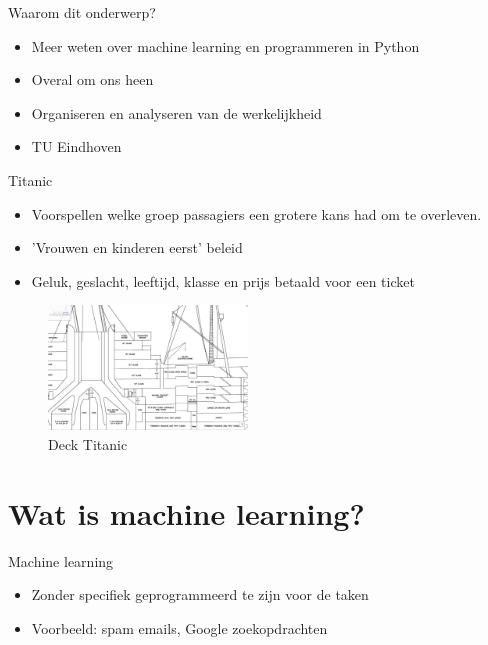 \documentclass[presentation]{beamer}
\begin{document}
\begin{frame}[label={sec:org4663e78}]{Waarom dit onderwerp?}
\begin{itemize}
\item Meer weten over machine learning en programmeren in Python
\item Overal om ons heen
\item Organiseren en analyseren van de werkelijkheid
\item TU Eindhoven
\end{itemize}
\end{frame}


\begin{frame}[label={sec:org2e7acb5}]{Titanic}
\begin{itemize}
\item Voorspellen welke groep passagiers een grotere kans had om te overleven.
\item 'Vrouwen en kinderen eerst' beleid
\item Geluk, geslacht, leeftijd, klasse en prijs betaald voor een ticket
\end{itemize}
\begin{figure}[htbp]
\centering
\includegraphics[width=200]{./Deck3.png}
\caption{\label{}
Deck Titanic}
\end{figure}
\end{frame}


\section*{Wat is machine learning?}
\label{sec:orge38d414}

\begin{frame}[label={sec:org1ec8526}]{Machine learning}
\begin{itemize}
\item Zonder specifiek geprogrammeerd te zijn voor de taken
\item Voorbeeld: spam emails, Google zoekopdrachten
\end{itemize}
\end{frame}
\end{document}

